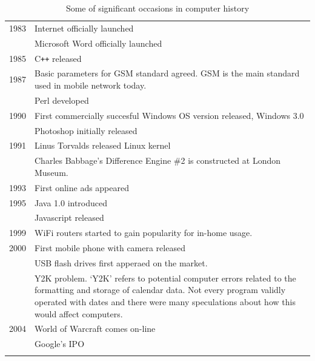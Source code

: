 \documentclass{report}
\begin{document}
\begin{longtable}{p{}p{}}
                \midrule
                1983 & Internet officially launched \\
                \cmidrule(r){2-2}
                     & Microsoft Word officially launched \\
                \midrule
                1985 & C\texttt{++} released \\
                \midrule
                1987 & Basic parameters for GSM standard agreed. GSM is the main standard used in mobile network today. \\
                \cmidrule(r){2-2}
                     & Perl developed\\
                \midrule
                1990 & First commercially succesful Windows OS version released, Windows 3.0 \\
                \cmidrule(r){2-2}
                     & Photoshop initially released \\
                \midrule
                1991 & Linus Torvalds released Linux kernel \\
                \cmidrule(r){2-2}
                     & Charles Babbage's Difference Engine \#2 is constructed at London Museum. \\
                \midrule
                1993 & First online ads appeared \\
                \midrule
                1995 & Java 1.0 introduced \\
                \cmidrule(r){2-2}
                     & Javascript released \\
                \midrule
                1999 & WiFi routers started to gain popularity for in-home usage. \\
                \midrule
                2000 & First mobile phone with camera released \\
                \cmidrule(r){2-2}
                     & USB flash drives first apperaed on the market. \\
                \cmidrule(r){2-2}
                     & Y2K problem. `Y2K' refers to potential computer errors related to the formatting and storage of calendar data. Not every program validly operated 
                        with dates and there were many speculations about how this would affect computers.\\
                \midrule
                2004 & World of Warcraft comes on-line \\
                \cmidrule(r){2-2}
                     & Google's IPO\\
                
                \bottomrule
                
                \caption{Some of significant occasions in computer history}
            \end{longtable}
\end{document}

